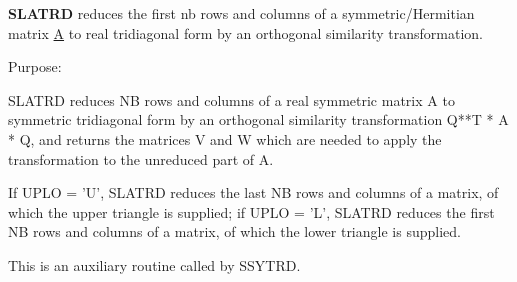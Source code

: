{\bfseries S\+L\+A\+T\+R\+D} reduces the first nb rows and columns of a symmetric/\+Hermitian matrix \hyperlink{classA}{A} to real tridiagonal form by an orthogonal similarity transformation. 

 \begin{DoxyParagraph}{Purpose\+: }
\begin{DoxyVerb} SLATRD reduces NB rows and columns of a real symmetric matrix A to
 symmetric tridiagonal form by an orthogonal similarity
 transformation Q**T * A * Q, and returns the matrices V and W which are
 needed to apply the transformation to the unreduced part of A.

 If UPLO = 'U', SLATRD reduces the last NB rows and columns of a
 matrix, of which the upper triangle is supplied;
 if UPLO = 'L', SLATRD reduces the first NB rows and columns of a
 matrix, of which the lower triangle is supplied.

 This is an auxiliary routine called by SSYTRD.\end{DoxyVerb}
 
\end{DoxyParagraph}

